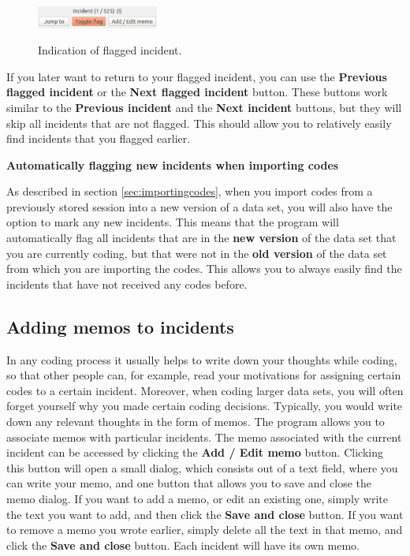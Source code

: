 \documentclass{memoir}
\begin{document}
\begin{figure}[h!]
  \centering
  \caption{Indication of flagged incident.}
  \includegraphics[width=40mm]{Screenshot_5.pdf}
  \label{fig:flaggedincident}
\end{figure}

If you later want to return to your flagged incident, you can use the \textbf{Previous flagged incident} or the \textbf{Next flagged incident} button. These buttons work similar to the \textbf{Previous incident} and the \textbf{Next incident} buttons, but they will skip all incidents that are not flagged. This should allow you to relatively easily find incidents that you flagged earlier.

\begin{framed}
\textbf{Automatically flagging new incidents when importing codes}
  
  As described in section \ref{sec:importingcodes}, when you import codes from a previously stored session into a new version of a data set, you will also have the option to mark any new incidents. This means that the program will automatically flag all incidents that are in the \textbf{new version} of the data set that you are currently coding, but that were not in the \textbf{old version} of the data set from which you are importing the codes. This allows you to always easily find the incidents that have not received any codes before. 
\end{framed}

\subsection{Adding memos to incidents}
\label{sec:memosincidents}

In any coding process it usually helps to write down your thoughts while coding, so that other people can, for example, read your motivations for assigning certain codes to a certain incident. Moreover, when coding larger data sets, you will often forget yourself why you made certain coding decisions. Typically, you would write down any relevant thoughts in the form of memos. The program allows you to associate memos with particular incidents. The memo associated with the current incident can be accessed by clicking the \textbf{Add / Edit memo} button. Clicking this button will open a small dialog, which consists out of a text field, where you can write your memo, and one button that allows you to save and close the memo dialog. If you want to add a memo, or edit an existing one, simply write the text you want to add, and then click the \textbf{Save and close} button. If you want to remove a memo you wrote earlier, simply delete all the text in that memo, and click the \textbf{Save and close} button. Each incident will have its own memo.
\end{document}
